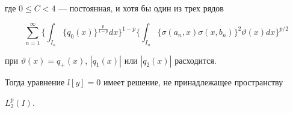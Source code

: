 {\begin{itemize}
где $0\le C<4$ --- постоянная, и хотя бы один из трех рядов 


$$ 


\sum^\infty_{n=1}\bigg\{\int_{I_n} 


\{q_0(x)\}^{\frac{p}{1-p}}d x\bigg\}^{1-p}\bigg\{ 


\int_{I_n}\{\sigma(a_n,x)\sigma(x,b_n)\}^2 


\vartheta(x)d x\bigg\}^{p/2} 


$$ 


при $\vartheta(x)=q_+(x)$, $|q_1(x)|$ или $|q_2(x)|$ расходится. 


\end{itemize} 





Тогда уравнение $l[y]=0$ имеет решение, не принадлежащее пространству 


$L^p_2(I)$. 


} 


 


